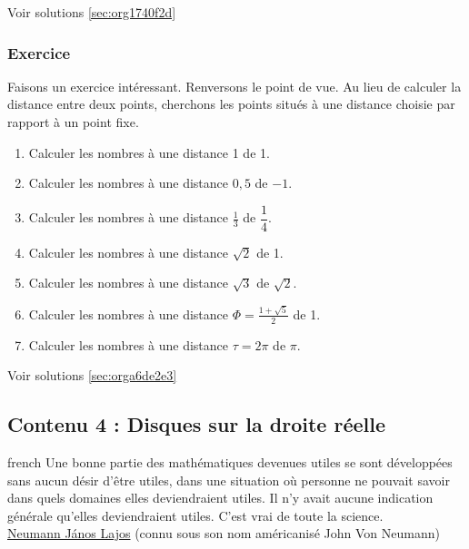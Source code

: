 \documentclass[a4paper, 11pt, twoside]{article}
\begin{document}
Voir solutions \ref{sec:org1740f2d}

\subsubsection{Exercice}
\label{sec:org275d8c1}
Faisons un exercice intéressant. Renversons le point de vue. Au
lieu de calculer la distance entre deux points, cherchons les
points situés à une distance choisie par rapport à un point fixe.

\begin{enumerate}
\item Calculer les nombres à une distance 1 de 1.
\item Calculer les nombres à une distance \(0,5\) de \(-1\).
\item Calculer les nombres à une distance \(\frac{1}{3}\) de
\(\dfrac{1}{4}\).
\item Calculer les nombres à une distance \(\sqrt{2}\) de 1.
\item Calculer les nombres à une distance \(\sqrt{3}\) de \(\sqrt{2}\).
\item Calculer les nombres à une distance \(\Phi = \frac{1 +
       \sqrt{5}}{2}\) de 1.
\item Calculer les nombres à une distance \(\tau = 2\pi\) de \(\pi\).
\end{enumerate}


Voir solutions \ref{sec:orga6de2e3}
\stopcontents[level-2]

\subsection{Contenu 4 : Disques sur la droite réelle}
\label{sec:org8448569}

\begin{foreigndisplayquote}{french}
Une bonne partie des mathématiques devenues utiles se sont
développées sans aucun désir d'être utiles, dans une situation où
personne ne pouvait savoir dans quels domaines elles deviendraient
utiles. Il n'y avait aucune indication générale qu'elles
deviendraient utiles. C'est vrai de toute la science.\\

\href{https://fr.wikipedia.org/wiki/John\_von\_Neumann}{Neumann János Lajos} (connu sous son nom américanisé John Von Neumann)
\end{foreigndisplayquote}


\startcontents[level-2]
\end{document}

